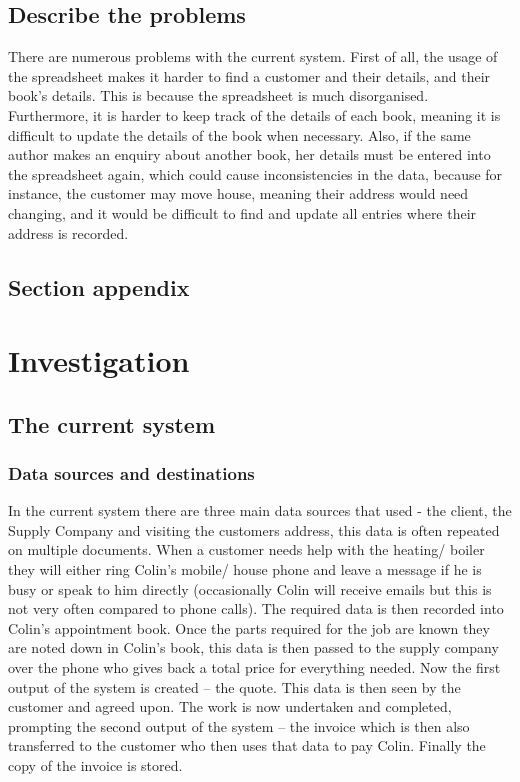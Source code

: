 \subsection{Describe the problems}
There are numerous problems with the current system. First of all, the usage of the spreadsheet makes it harder to find a customer and their details, and their book’s details. This is because the spreadsheet is much disorganised. Furthermore, it is harder to keep track of the details of each book, meaning it is difficult to update the details of the book when necessary. Also, if the same author makes an enquiry about another book, her details must be entered into the spreadsheet again, which could cause inconsistencies in the data, because for instance, the customer may move house, meaning their address would need changing, and it would be difficult to find and update all entries where their address is recorded.

\subsection{Section appendix}

\section{Investigation}

\subsection{The current system}

\subsubsection{Data sources and destinations}
In the current system there are three main data sources that used - the client, the Supply Company and visiting the customers address, this data is often repeated on multiple documents. When a customer needs help with the heating/ boiler they will either ring Colin’s mobile/ house phone and leave a message if he is busy or speak to him directly (occasionally Colin will receive emails but this is not very often compared to phone calls). The required data is then recorded into Colin’s appointment book. Once the parts required for the job are known they are noted down in Colin’s book, this data is then passed to the supply company over the phone who gives back a total price for everything needed. Now the first output of the system is created – the quote. This data is then seen by the customer and agreed upon. The work is now undertaken and completed, prompting the second output of the system – the invoice which is then also transferred to the customer who then uses that data to pay Colin. Finally the copy of the invoice is stored.

